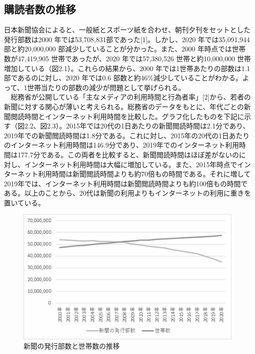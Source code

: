 \subsection{購読者数の推移}
日本新聞協会によると、一般紙とスポーツ紙を合わせ、朝刊夕刊をセットとした発行部数は2000 年では53,708,831部であった[1]。しかし、2020 年では35,091,944 部と約20,000,000 部減少していることが分かった。また、2000 年時点では世帯数が47,419,905 世帯であったが、2020 年では57,380,526 世帯と約10,000,000 世帯増加している（図2.1）。これらの結果から、2000 年では1世帯あたりの部数は1.1 部であるのに対し、2020 年では0.6 部数と約46\%減少していることがわかる。よって、1世帯当たりの部数の減少が問題として挙げられる。\\
　総務省が公開している「主なメディアの利用時間と行為者率」[2]から、若者の新聞に対する関心が薄いと考えられる。総務省のデータをもとに、年代ごとの新聞閲読時間とインターネット利用時間を比較した。グラフ化したものを下記に示す（図2.2、図2.3）。2015年では20代の1日あたりの新聞閲読時間は2.1分であり、2019年での新聞閲読時間は1.8分である。これに対し、2015年の20代の1日あたりのインターネット利用時間は146.9分であり、2019年でのインターネット利用時間は177.7分である。この両者を比較すると、新聞閲読時間はほぼ差がないのに対し、インターネット利用時間は大幅に増加している。また、2015年時点でインターネット利用時間は新聞閲読時間よりも約70倍もの時間である。それに増して2019年では、インターネット利用時間は新聞閲読時間よりも約100倍もの時間である。以上のことから、20代は新聞の利用よりもインターネットの利用に重きを置いている。
\newpage
\begin{figure}[htbp]
    \centering
    \includegraphics[keepaspectratio, scale=0.35]{images/newspaper1.png}
    \caption{新聞の発行部数と世帯数の推移}
    \label{fig:my_label}
\end{figure}

